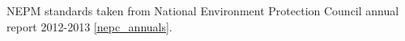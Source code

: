 \label{fig:nepm}
NEPM standards taken from National Environment Protection Council annual report 2012-2013 \ref{nepc_annuals}.